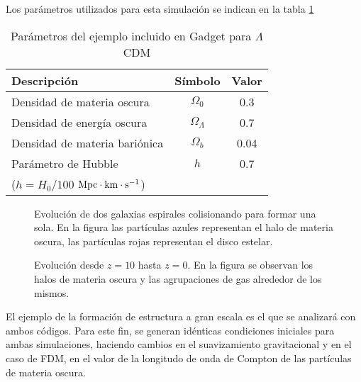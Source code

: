 \documentclass[a4paper,openright,12pt]{book}
\begin{document}
Los parámetros utilizados para esta simulación se indican en la tabla \ref{Tabla 3.1}
\begin{table}[htb]%
\caption{Parámetros del ejemplo incluido en Gadget para $\Lambda$CDM}
\label{Tabla 3.1}\centering%
\begin{tabular}{lcc}
\toprule%
Descripción&Símbolo&Valor\\\toprule%
Densidad de materia oscura&$\Omega_{0}$&0.3\\
Densidad de energía oscura&$\Omega_{\Lambda}$&0.7\\
Densidad de materia bariónica&$\Omega_{b}$&0.04\\\midrule
Parámetro de Hubble&$h$&0.7\\
($h=H_{0}/100$ $\textup{Mpc}\cdot\textup{km}\cdot\textup{s}^{-1}$)\\\bottomrule
\end{tabular}
\end{table}


\begin{figure}[htpb]
\centering
{}
\caption{\footnotesize{Evolución de dos galaxias espirales colisionando para formar una sola. En la figura las partículas azules representan el halo de materia oscura, las partículas rojas representan el disco estelar.}} \label{fig 3.3}
\end{figure}

\begin{figure}[htpb]
\centering
{}
\caption{\footnotesize{Evolución desde $z=10$ hasta $z = 0$. En la figura se observan los halos de materia oscura y las agrupaciones de gas alrededor de los mismos.}} \label{fig 3.5}
\end{figure}
El ejemplo de la formación de estructura a gran escala es el que se analizará con ambos códigos. Para este fin, se generan idénticas condiciones iniciales para ambas simulaciones, haciendo cambios en el suavizamiento gravitacional y en el caso de FDM, en el valor de la longitudo de onda de Compton de las partículas de materia oscura.  
\end{document}
